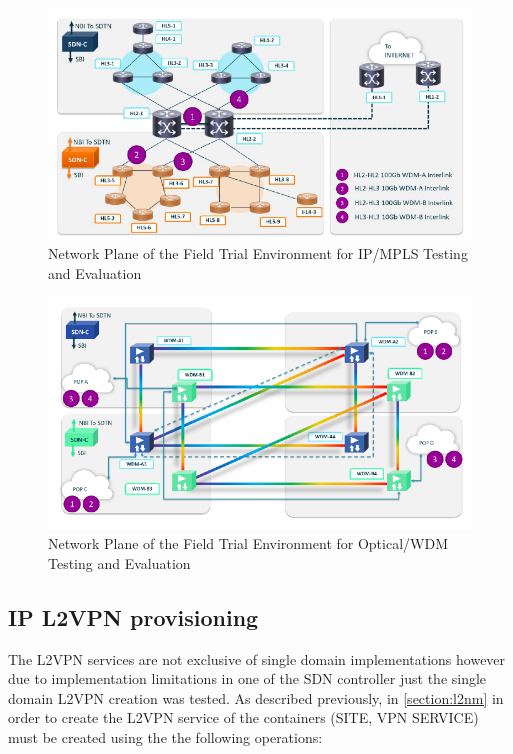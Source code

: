 \documentclass[a4paper,fleqn]{cas-dc}
\begin{document}
\begin{figure}
	\centering
		\includegraphics[scale=1]{figs/field_trial_environment_ip.pdf}
	\caption{Network Plane of the Field Trial Environment for IP/MPLS Testing and Evaluation}
	\label{FIG:field_trial_ip}
\end{figure}

\begin{figure}
	\centering
		\includegraphics[scale=1]{figs/field_trial_environment_optical.pdf}
	\caption{Network Plane of the Field Trial Environment for Optical/WDM Testing and Evaluation}
	\label{FIG:field_trial_optical}
\end{figure}

\subsection{IP L2VPN provisioning}
\label{section:single-l2nm}

The L2VPN services are not exclusive of single domain implementations however due to implementation limitations in one of the SDN controller just the single domain L2VPN creation was tested. As described previously, in \cref{section:l2nm} in order to create the L2VPN service of the containers (SITE, VPN SERVICE) must be created using the the following operations:
\end{document}
